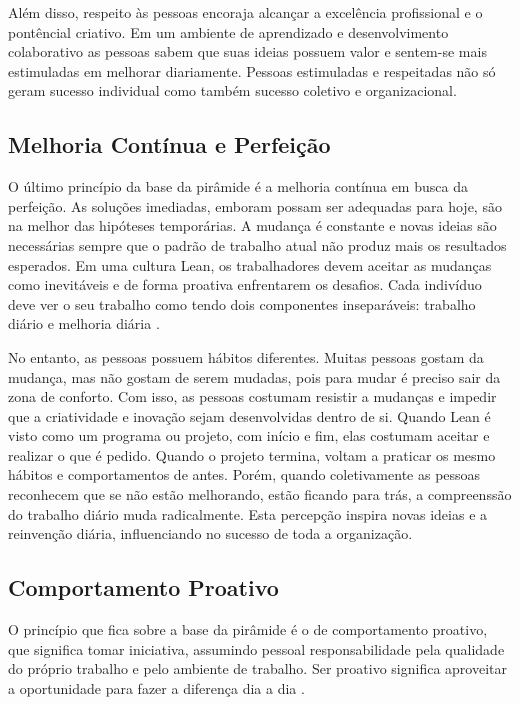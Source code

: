 \begin{anexosenv}
Além disso, respeito às pessoas encoraja alcançar a excelência profissional e o pontêncial criativo. Em um ambiente de aprendizado e desenvolvimento colaborativo as pessoas sabem que suas ideias possuem valor e sentem-se mais estimuladas em melhorar diariamente. Pessoas estimuladas e respeitadas não só geram sucesso individual como também sucesso coletivo e organizacional.


\subsection[Melhoria Contínua e Perfeição]{Melhoria Contínua e Perfeição}

O último princípio da base da pirâmide é a melhoria contínua em busca da perfeição.  As soluções imediadas, emboram possam ser adequadas para hoje, são na melhor das hipóteses temporárias.  A mudança é constante e novas ideias são necessárias  sempre que o padrão de trabalho atual não produz mais os resultados esperados. Em uma cultura Lean, os trabalhadores devem aceitar as mudanças como inevitáveis e de forma proativa enfrentarem os desafios. Cada indivíduo deve ver o seu trabalho como tendo dois componentes inseparáveis: trabalho diário e melhoria diária \cite{bell2011}.

No entanto, as pessoas possuem hábitos diferentes. Muitas pessoas gostam da mudança, mas não gostam de serem mudadas, pois para mudar é preciso sair da zona de conforto.  Com isso, as pessoas costumam resistir a mudanças e impedir que a criatividade e inovação sejam desenvolvidas dentro de si.  Quando Lean é visto como um programa ou projeto, com início e fim, elas costumam aceitar e realizar o que é pedido. Quando o projeto termina, voltam a praticar os mesmo hábitos e comportamentos de antes. Porém, quando coletivamente as pessoas reconhecem que se não estão melhorando, estão ficando para trás, a compreenssão do trabalho diário muda radicalmente. Esta percepção inspira novas ideias e a reinvenção diária, influenciando no sucesso de toda a organização\cite{bell2011}.


\subsection[Comportamento Proativo]{Comportamento Proativo}

O princípio que fica sobre a base da pirâmide é o de comportamento proativo, que significa tomar iniciativa, assumindo pessoal responsabilidade pela qualidade do próprio trabalho e pelo ambiente de trabalho. Ser proativo significa aproveitar a oportunidade para fazer a diferença dia a dia \cite{bell2011}.


\end{anexosenv}
